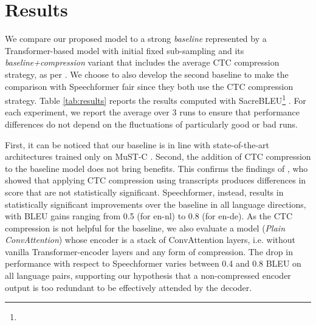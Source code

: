 \documentclass[11pt]{article}
\begin{document}
\section{Results}
We compare our proposed model to a strong \emph{baseline} represented by a Transformer-based model with initial fixed sub-sampling \cite{wang-etal-2020-fairseq} and its \emph{baseline+compression} variant that includes the average CTC compression strategy, as per \cite{gaido-etal-2021-ctc}. We choose to also develop the second baseline to make the comparison with Speechformer fair since they both use the CTC compression strategy.
Table \ref{tab:results} reports the results computed with SacreBLEU\footnote{} \cite{post-2018-call}. For each experiment, we report the average over 3 runs to ensure that performance differences do not depend on the fluctuations of particularly good
or bad runs.

First, it can be noticed that our baseline is in line with state-of-the-art architectures trained only on MuST-C \cite{wang-etal-2020-fairseq, inaguma-etal-2020-espnet}. Second, the addition of CTC compression to the baseline model does not bring benefits. This confirms the findings of , who showed that applying CTC compression using transcripts produces differences in score that are not statistically significant.
Speechformer, instead, results in statistically significant improvements over the baseline in all language directions, with BLEU gains ranging from 0.5 (for en-nl) to 0.8 (for en-de).
As the CTC compression is not helpful for the baseline, we also evaluate a model (\emph{Plain ConvAttention}) whose encoder is a stack of ConvAttention layers, i.e. without vanilla Transformer-encoder layers and any form of compression. The drop in performance with respect to Speechformer varies between 0.4 and 0.8 BLEU on all language pairs, supporting our hypothesis that a non-compressed encoder output is too redundant to be effectively attended by the decoder.
\end{document}
